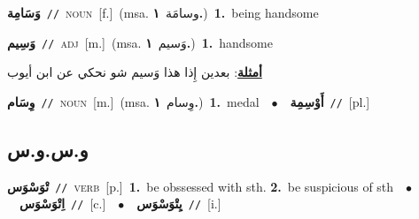 \documentclass[10pt,a4paper,twoside]{article} %
\begin{document}
\begin{multicols}{2}
{\setlength\topsep{0pt}\textbf{\foreignlanguage{arabic}{وَسَامِة}}\ {\color{gray}\texttt{//}\color{black}}\ \textsc{noun}\ [f.]\ \color{gray}(msa. \foreignlanguage{arabic}{وسامَة}~\foreignlanguage{arabic}{\textbf{١.}})\color{black}\ \textbf{1.}~being handsome\ } \vspace{2mm}

{\setlength\topsep{0pt}\textbf{\foreignlanguage{arabic}{وَسِيم}}\ {\color{gray}\texttt{//}\color{black}}\ \textsc{adj}\ [m.]\ \color{gray}(msa. \foreignlanguage{arabic}{وَسيم}~\foreignlanguage{arabic}{\textbf{١.}})\color{black}\ \textbf{1.}~handsome\  \begin{flushright}\color{gray}\foreignlanguage{arabic}{\textbf{\underline{\foreignlanguage{arabic}{أمثلة}}}: بعدين إِذا هذا وَسيم شو نحكي عن ابن أيوب}\end{flushright}\color{black}} \vspace{2mm}

{\setlength\topsep{0pt}\textbf{\foreignlanguage{arabic}{وِسَام}}\ {\color{gray}\texttt{//}\color{black}}\ \textsc{noun}\ [m.]\ \color{gray}(msa. \foreignlanguage{arabic}{وِسام}~\foreignlanguage{arabic}{\textbf{١.}})\color{black}\ \textbf{1.}~medal\ \ $\bullet$\ \ \setlength\topsep{0pt}\textbf{\foreignlanguage{arabic}{أَوْسِمِة}}\ {\color{gray}\texttt{//}\color{black}}\ [pl.]\ } \vspace{2mm}

\vspace{-3mm}
\subsection*{\color{blue}\foreignlanguage{arabic}{و.س.و.س}\color{blue}{}} 

{\setlength\topsep{0pt}\textbf{\foreignlanguage{arabic}{تْوَسْوَس}}\ {\color{gray}\texttt{//}\color{black}}\ \textsc{verb}\ [p.]\ \textbf{1.}~be obssessed with sth.  \textbf{2.}~be suspicious of sth\ \ $\bullet$\ \ \setlength\topsep{0pt}\textbf{\foreignlanguage{arabic}{اِتْوَسْوَس}}\ {\color{gray}\texttt{//}\color{black}}\ [c.]\ \ $\bullet$\ \ \setlength\topsep{0pt}\textbf{\foreignlanguage{arabic}{يِتْوَسْوَس}}\ {\color{gray}\texttt{//}\color{black}}\ [i.]\ } \vspace{2mm}


\end{multicols}
\end{document}
